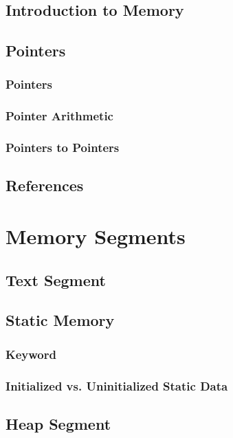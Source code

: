 \documentclass{article}
\begin{document}
\subsection{Introduction to Memory}

\subsection{Pointers}

\subsubsection{ Pointers}

\subsubsection{Pointer Arithmetic}

\subsubsection{Pointers to Pointers}

\subsection{References}

\section{Memory Segments}

\subsection{Text Segment}

\subsection{Static Memory}

\subsubsection{ Keyword}

\subsubsection{Initialized vs. Uninitialized Static Data}

\subsection{Heap Segment}
\end{document}

